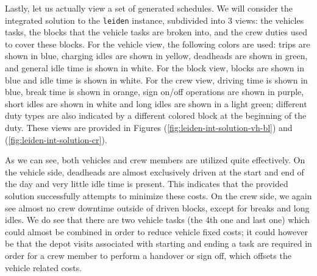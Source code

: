 \documentclass[]{article}
\begin{document}
Lastly, let us actually view a set of generated schedules. We will consider the integrated solution to the \texttt{leiden} instance, subdivided into 3 views: the vehicles tasks, the blocks that the vehicle tasks are broken into, and the crew duties used to cover these blocks. For the vehicle view, the following colors are used: trips are shown in blue, charging idles are shown in yellow, deadheads are shown in green, and general idle time is shown in white. For the block view, blocks are shown in blue and idle time is shown in white. For the crew view, driving time is shown in blue, break time is shown in orange, sign on/off operations are shown in purple, short idles are shown in white and long idles are shown in a light green; different duty types are also indicated by a different colored block at the beginning of the duty. These views are provided in Figures (\ref{fig:leiden-int-solution-vh-bl}) and (\ref{fig:leiden-int-solution-cr}).

As we can see, both vehicles and crew members are utilized quite effectively. On the vehicle side, deadheads are almost exclusively driven at the start and end of the day and very little idle time is present. This indicates that the provided solution successfully attempts to minimize these costs. On the crew side, we again see almost no crew downtime outside of driven blocks, except for breaks and long idles. We do see that there are two vehicle tasks (the 4th one and last one) which could almost be combined in order to reduce vehicle fixed costs; it could however be that the depot visits associated with starting and ending a task are required in order for a crew member to perform a handover or sign off, which offsets the vehicle related costs.
\end{document}
